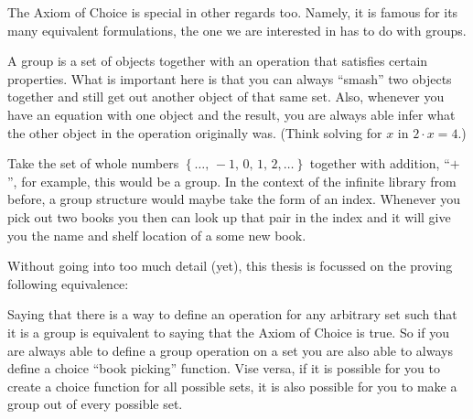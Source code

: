 \documentclass[../../main.tex]{subfiles}
\begin{document}
The Axiom of Choice is special in other regards too.
Namely, it is famous for its many equivalent formulations, the one we are interested in has to do with groups.

A group is a set of objects together with an operation that satisfies certain properties.
What is important here is that you can always ``smash'' two objects together and still get out another object of that same set.
Also, whenever you have an equation with one object and the result, you are always able infer what the other object in the operation originally was.
(Think solving for $x$ in $2 \cdot x = 4$.)

Take the set of whole numbers $\left\{\ldots,\, -1,\, 0,\, 1,\, 2,\ldots\right\}$ together with addition, ``$+$'', for example, this would be a group.
In the context of the infinite library from before, a group structure would maybe take the form of an index.
Whenever you pick out two books you then can look up that pair in the index and it will give you the name and shelf location of a some new book.

Without going into too much detail (yet), this thesis is focussed on the proving following equivalence:

Saying that there is a way to define an operation for any arbitrary set such that it is a group is equivalent to saying that the Axiom of Choice is true.
So if you are always able to define a group operation on a set you are also able to always define a choice ``book picking'' function.
Vise versa, if it is possible for you to create a choice function for all possible sets, 
it is also possible for you to make a group out of every possible set.
\end{document}

